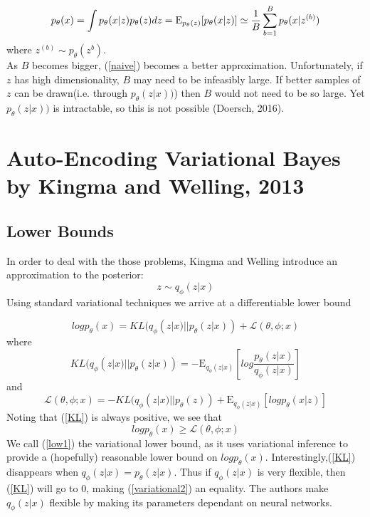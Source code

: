 \documentclass[10pt]{article}
\begin{document}
\begin{equation} \label{naive} 
p_{\theta}(x) = \int{p_{\theta}{(x|z)} {p_{\theta}{(z)}} dz}\\
= \mathrm{E}_{p_{\theta}(z)}[p_{\theta}{(x|z)}]
\simeq \frac{1}{B}\sum_{b=1}^{B}p_{\theta}{(x|z^{(b)})}
\end{equation}
where $z^{(b)}\sim p_{\theta}(z^b) $. \\
As $B$ becomes bigger, (\ref{naive}) becomes a better approximation.
Unfortunately, if $z$ has high dimensionality, $B$ may
need to be infeasibly large.  If better samples of $z$ can be drawn(i.e. through $p_{\theta}(z|x))$) then
$B$ would not need to be so large.  Yet $p_{\theta}(z|x))$ is intractable, so this 
is not possible (Doersch, 2016).    

\section{ Auto-Encoding Variational Bayes by Kingma and Welling, 2013}
\subsection{Lower Bounds}
In order to deal with the those problems, Kingma and Welling
introduce an approximation to the posterior:
\begin{equation} \label{approx}
z \sim  q_{\phi}{(z|x)}
\end{equation}
Using standard variational techniques we arrive at a differentiable
lower bound

\begin{equation} \label{variational1}
log p_{\theta}(x) = KL(q_{\phi}(z|x) || p_{\theta}(z|x)) +  \mathcal{L} (\theta , \phi ; x) 
\end{equation}
where
\begin{equation} \label{KL}
KL(q_{\phi}(z|x) || p_{\theta}(z|x)) =  -\mathrm{E}_{q_{\phi}(z|x) } [log\frac{p_{\theta}(z|x) } {q_{\phi}(z|x) }] 
\end{equation}
and
\begin{equation} \label{low1}
\mathcal{L} (\theta , \phi ; x) =  -KL(q_{\phi}(z|x) || p_{\theta}(z)) + \mathrm{E}_{q_{\phi}(z|x) } [logp_{\theta}(x|z)]
\end{equation}
Noting that (\ref{KL}) is always positive, we see that 
\begin{equation} \label{variational2}
log p_{\theta}(x) \ge \mathcal{L} (\theta , \phi ; x)
\end{equation}
We call (\ref{low1}) the variational lower bound, as it uses variational inference to
provide a (hopefully) reasonable lower bound on $logp_{\theta}(x)$.  Interestingly,(\ref{KL}) disappears
when $q_{\phi}(z|x) = p_{\theta}(z|x)$.  Thus if $q_{\phi}(z|x)$ is
very flexible, then (\ref{KL}) will go to 0, making (\ref{variational2}) an equality.  The authors make 
$q_{\phi}(z|x)$ flexible by making its parameters dependant on neural networks.    
\end{document}
